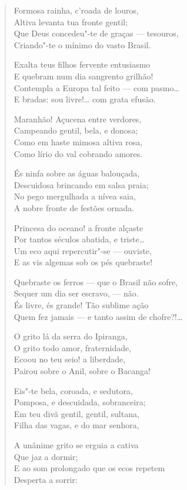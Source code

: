 \begin{verse}
Formosa rainha, c'roada de louros,\\
Altiva levanta tua fronte gentil;\\
Que Deus concedeu"-te de graças --- tesouros,\\
Criando"-te o mínimo do vasto Brasil.

Exalta teus filhos fervente entusiasmo\\
E quebram num dia sangrento grilhão!\\
Contempla a Europa tal feito --- com pasmo\ldots{}\\
E bradas: sou livre!\ldots{} com grata efusão.

Maranhão! Açucena entre verdores,\\
Campeando gentil, bela, e donosa;\\
Como em haste mimosa altiva rosa,\\
Como lírio do val cobrando amores.

És ninfa sobre as águas balouçada,\\
Descuidosa brincando em salsa praia;\\
No pego mergulhada a nívea saia,\\
A nobre fronte de festões ornada.

Princesa do oceano! a fronte alçaste\\
Por tantos séculos abatida, e triste\ldots{}\\
Um eco aqui repercutir"-se --- ouviste,\\
E as vis algemas sob os pés quebraste!

Quebraste os ferros --- que o Brasil não sofre,\\
Sequer um dia ser escravo, --- não.\\
És livre, és grande! Tão sublime ação\\
Quem fez jamais --- e tanto assim de chofre?!\ldots{}

O grito lá da serra do Ipiranga,\\
O grito todo amor, fraternidade,\\
Ecoou no teu seio! a liberdade,\\
Pairou sobre o Anil, sobre o Bacanga!

Eis"-te bela, coroada, e sedutora,\\
Pomposa, e descuidada, sobranceira;\\
Em teu divã gentil, gentil, sultana,\\
Filha das vagas, e do mar senhora,

A unânime grito se erguia a cativa\\
Que jaz a dormir;\\
E ao som prolongado que os ecos repetem\\
Desperta a sorrir:


\end{verse}
